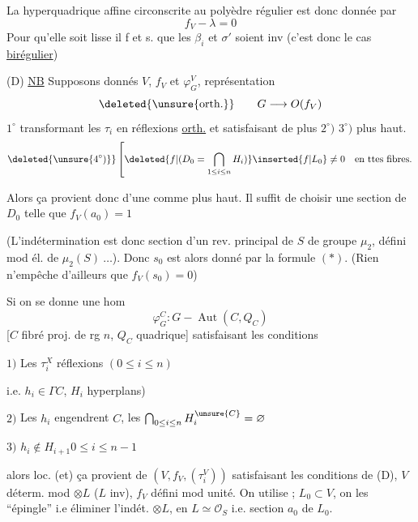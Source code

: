 La hyperquadrique affine circonscrite au polyèdre régulier est donc donnée par
\[
f_V-\lambda=0
\]
Pour qu'elle soit 
lisse il f et s. que les $\beta_i$ et $\sigma'$ soient inv
(c'est donc le cas \uline{birégulier})

(D) \uline{NB} Supposons donnés $V$, $f_V$ et $\varphi_G^V$,
représentation
\[
\deleted{\text{\unsure{orth.}}}\qquad G\longrightarrow O(f_V)
\]
$1^\circ$ transformant les $\tau_i$ en réflexions \uline{orth.}
et satisfaisant de plus $2^\circ)$ $3^\circ)$ plus haut.
\[
\deleted{\unsure{4^\circ)}}
\left[
\deleted{f|(D_0=\bigcap_{1\leq i\leq n}H_i)}
\inserted{f|L_0}\neq0\quad\text{en ttes fibres.}
\right.
\]

Alors ça provient donc  d'une  \uline{}
comme plus haut. Il suffit de choisir une section  de $D_0$
telle que $f_V(a_0)=1$


(L'indétermination est donc section d'un rev. principal de $S$ de groupe $\mu_2$,
défini mod él. de $\mu_2(S)\ \ldots$).
Donc $s_0$ est alors donné par la formule $(*)$.
(Rien n'empêche d'ailleurs que $f_V(s_0)=0$)

Si on se donne une hom
\[
\varphi_G^C:G\mathbin{-}\operatorname{Aut}(C,Q_C)
\]
[$C$ fibré proj. de rg $n$, $Q_C$ quadrique]
satisfaisant les conditions

$1)$ Les $\tau_i^X$ réflexions 
\hfill$(0\leq i\leq n)$

\hfill i.e. $h_i\in\Gamma C$, $H_i$ hyperplans)

$2)$ Les $h_i$ engendrent $C$, les
$\bigcap_{0\leq i\leq n}H_i^{\unsure{C}}=\varnothing$

$3)$ 
\quad$h_i\notin H_{i+1}$\hfill$0\leq i\leq n-1$


\margin{(Si $n=1$, une réflexion de $C$ donne \unsure{pour}
$C=P(W)$, \unsure{ne remonte pas} de \uline{façon unique}
en \unsure{réfl.} de $V\ldots$]}

alors loc. (et) ça provient de
$(V,f_V,(\tau_i^V))$ satisfaisant les conditions de (D),
$V$ déterm. mod $\otimes L$ ($L$ inv),
$f_V$ défini mod unité.
On utilise ;
$L_0\subset V$, on les ``épingle'' i.e éliminer l'indét. $\otimes L$,
en  $L\simeq\mathcal O_S$
i.e. section $a_0$ de $L_0$.

